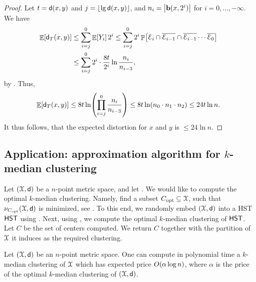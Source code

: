 \begin{proof}
    Let $t = \mathsf{d}(x,y)$ and $j = \left\lfloor {\lg \mathsf{d}(x,y)} \right\rfloor$, and $n_i =
    \left| {\mathbf{b}(x,2^i)} \right|$ for $i=0, \ldots, -\infty$. We have
    \begin{align*}
    \Ex{ \DistChar_T(x,y)} &\leq \sum_{i=j}^{0} \Ex{Y_i} 2^i \leq
    \sum_{i=j}^{0} 2^i \Prob{ \Event_i \cap \overline{\Event_{i-1}}
       \cap \overline{\Event_{i-1}} \cdots \overline{\Event_{0}}}
    \\&\leq
    \sum_{i=j}^{0} 2^i \cdot \frac{8t}{2^i} \ln \frac{n_i}{n_{i-3}},
    \end{align*}
    by . Thus,
    \begin{equation*}
    \Ex{ \DistChar_T(x,y)} \leq 8t \ln \pth{\prod_{i=j}^{0}
       \frac{n_i}{n_{i-3}}}
    \leq 8t \ln \pth{ n_0 \cdot n_1 \cdot n_2 }
    \leq 24 t \ln n.
    \end{equation*}
    It thus follows, that the expected distortion for $x$ and $y$ is
    $\leq 24 \ln n$.
\end{proof}

\subsection{Application: approximation algorithm for $k$-median clustering}

Let $(\FMS,\DistChar)$ be a $n$-point metric space, and let
.
We would like to compute the optimal $k$-median
clustering. Namely, find a subset $\Copt \subseteq \FMS$, such that
$\MdPrc_{\Copt}(\FMS,\DistChar)$ is minimized, see . To
this end, we randomly embed $(\FMS,\DistChar)$ into a HST $\HST$ using
. Next, using , we compute the optimal
$k$-median clustering of $\HST$. Let $C$ be the set of centers
computed. We return $C$ together with the partition of $\FMS$ it
induces as the required clustering.

\begin{theorem}
    Let $(\FMS,\DistChar)$ be an $n$-point metric space.
    One can compute in
    polynomial time a $k$-median clustering of $\FMS$ which has
    expected price $O\pth{ \alpha \log n }$, where $\alpha$ is the
    price of the optimal $k$-median clustering of $(\FMS,\DistChar)$.
\end{theorem}

